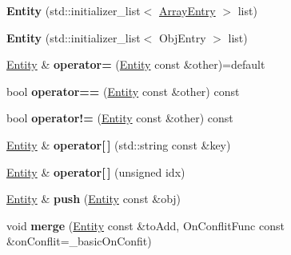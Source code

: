 \begin{DoxyCompactItemize}
{\bfseries Entity} (std\+::initializer\+\_\+list$<$ \hyperlink{classzany_1_1_entity}{Array\+Entry} $>$ list)
\item 
\mbox{\label{classzany_1_1_entity_ade02ec78fbfdf684461d5fb57ecec218}} 
{\bfseries Entity} (std\+::initializer\+\_\+list$<$ Obj\+Entry $>$ list)
\item 
\mbox{\label{classzany_1_1_entity_a4f301b0cdab72445a68912c994edd3d7}} 
\hyperlink{classzany_1_1_entity}{Entity} \& {\bfseries operator=} (\hyperlink{classzany_1_1_entity}{Entity} const \&other)=default
\item 
\mbox{\label{classzany_1_1_entity_a272ac41048907f59c46b9fc21cd184a0}} 
bool {\bfseries operator==} (\hyperlink{classzany_1_1_entity}{Entity} const \&other) const
\item 
\mbox{\label{classzany_1_1_entity_a7955362e5e19901f4890949862f8b7dc}} 
bool {\bfseries operator!=} (\hyperlink{classzany_1_1_entity}{Entity} const \&other) const
\item 
\mbox{\label{classzany_1_1_entity_a7cc96544785d0ce20a25a2d2b177f438}} 
\hyperlink{classzany_1_1_entity}{Entity} \& {\bfseries operator\mbox{[}$\,$\mbox{]}} (std\+::string const \&key)
\item 
\mbox{\label{classzany_1_1_entity_a2123776a705ab53965cf1bcbab5ac3e7}} 
\hyperlink{classzany_1_1_entity}{Entity} \& {\bfseries operator\mbox{[}$\,$\mbox{]}} (unsigned idx)
\item 
\mbox{\label{classzany_1_1_entity_aaace39cfc871d25e3a8e52b4bb949b7c}} 
\hyperlink{classzany_1_1_entity}{Entity} \& {\bfseries push} (\hyperlink{classzany_1_1_entity}{Entity} const \&obj)
\item 
\mbox{\label{classzany_1_1_entity_a603b1b5a8d685c89da2ae8159729f7fb}} 
void {\bfseries merge} (\hyperlink{classzany_1_1_entity}{Entity} const \&to\+Add, On\+Conflit\+Func const \&on\+Conflit=\+\_\+basic\+On\+Confit)
\item 
\mbox{\label{classzany_1_1_entity_afd73007d5ebe1119548653be5b59b8e1}} 

\end{DoxyCompactItemize}
